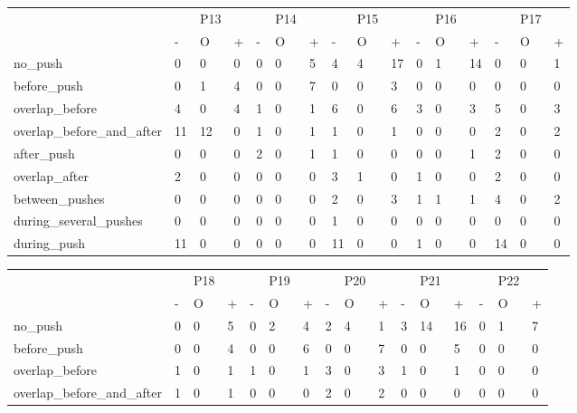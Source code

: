 \begin{screenonly}
\begin{table*}[h]
\begin{tabular*}{\hsize}{@{\extracolsep{\fill}}llllllllllllllll}
    \toprule
    &  & P13 &  &  & P14 &  &  & P15 &  &  & P16 &  &  & P17\\
    \cmidrule(lr){2-4}\cmidrule(lr){5-7}\cmidrule(lr){8-10}\cmidrule(lr){11-13}\cmidrule(lr){14-16}
    & - & O & + & - & O & + & - & O & + & - & O & + & - & O & +\\
    \cmidrule(lr){2-4}\cmidrule(lr){5-7}\cmidrule(lr){8-10}\cmidrule(lr){11-13}\cmidrule(lr){14-16}
    no\_push & 0 & 0 & 0 & 0 & 0 & 5 & 4 & 4 & 17 & 0 & 1 & 14 & 0 & 0 & 1\\
    before\_push & 0 & 1 & 4 & 0 & 0 & 7 & 0 & 0 & 3 & 0 & 0 & 0 & 0 & 0 & 0\\
    overlap\_before & 4 & 0 & 4 & 1 & 0 & 1 & 6 & 0 & 6 & 3 & 0 & 3 & 5 & 0 & 3\\
    overlap\_before\_and\_after & 11 & 12 & 0 & 1 & 0 & 1 & 1 & 0 & 1 & 0 & 0 & 0 & 2 & 0 & 2\\
    after\_push & 0 & 0 & 0 & 2 & 0 & 1 & 1 & 0 & 0 & 0 & 0 & 1 & 2 & 0 & 0\\
    overlap\_after & 2 & 0 & 0 & 0 & 0 & 0 & 3 & 1 & 0 & 1 & 0 & 0 & 2 & 0 & 0\\
    between\_pushes & 0 & 0 & 0 & 0 & 0 & 0 & 2 & 0 & 3 & 1 & 1 & 1 & 4 & 0 & 2\\
    during\_several\_pushes & 0 & 0 & 0 & 0 & 0 & 0 & 1 & 0 & 0 & 0 & 0 & 0 & 0 & 0 & 0\\
    during\_push & 11 & 0 & 0 & 0 & 0 & 0 & 11 & 0 & 0 & 1 & 0 & 0 & 14 & 0 & 0\\
\end{tabular*}
  \begin{tabular*}{\hsize}{@{\extracolsep{\fill}}llllllllllllllll}
    \toprule
    & & P18 &  &  & P19 &  &  & P20 &  &  & P21 &  &  & P22\\
    \cmidrule(lr){2-4}\cmidrule(lr){5-7}\cmidrule(lr){8-10}\cmidrule(lr){11-13}\cmidrule(lr){14-16}
    & - & O & + & - & O & + & - & O & + & - & O & + & - & O & +\\
    \cmidrule(lr){2-4}\cmidrule(lr){5-7}\cmidrule(lr){8-10}\cmidrule(lr){11-13}\cmidrule(lr){14-16}
    no\_push & 0 & 0 & 5 & 0 & 2 & 4 & 2 & 4 & 1 & 3 & 14 & 16 & 0 & 1 & 7\\
    before\_push & 0 & 0 & 4 & 0 & 0 & 6 & 0 & 0 & 7 & 0 & 0 & 5 & 0 & 0 & 0\\
    overlap\_before & 1 & 0 & 1 & 1 & 0 & 1 & 3 & 0 & 3 & 1 & 0 & 1 & 0 & 0 & 0\\
    overlap\_before\_and\_after & 1 & 0 & 1 & 0 & 0 & 0 & 2 & 0 & 2 & 0 & 0 & 0 & 0 & 0 & 0\\

\end{tabular*}
\end{table*}
\end{screenonly}
